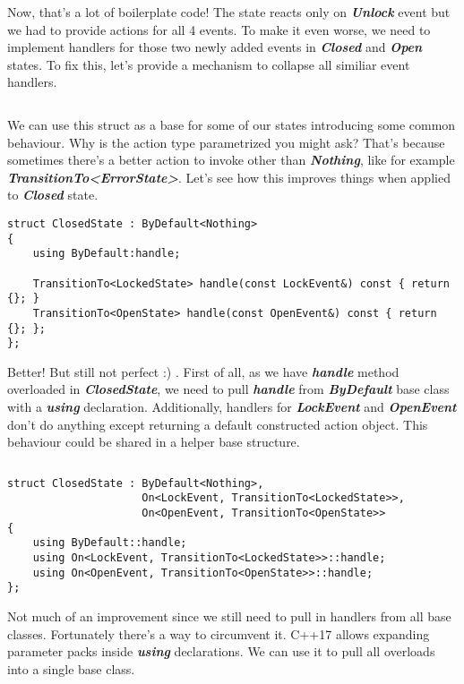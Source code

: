 \documentclass{article}[8pt]
\newcommand{\code}[1]{\textbf{\textit{#1}}}
\newcommand{\closed}{\code{Closed}}
\newcommand{\open}{\code{Open}}
\newcommand{\unlock}{\code{Unlock}}
\begin{document}
Now, that's a lot of boilerplate code! The state reacts only on \unlock{} event but we had to provide actions for all 4 events. To make it even worse, we need to implement handlers for those two newly added events in \closed{} and \open{} states. To fix this, let's provide a mechanism to collapse all similiar event handlers.

\bigskip
\inputminted[firstline=3]{c++}{../fsm/actions/ByDefault.h}
\bigskip

We can use this struct as a base for some of our states introducing some common behaviour. Why is the action type parametrized you might ask? That's because sometimes there's a better action to invoke other than \code{Nothing}, like for example
\\\code{TransitionTo<ErrorState>}. Let's see how this improves things when applied to \closed{} state.

\bigskip
\begin{verbatim}
struct ClosedState : ByDefault<Nothing>
{
	using ByDefault:handle;

	TransitionTo<LockedState> handle(const LockEvent&) const { return {}; }
	TransitionTo<OpenState> handle(const OpenEvent&) const { return {}; };
};
\end{verbatim}
\bigskip

Better! But still not perfect :) . First of all, as we have \code{handle} method overloaded in \code{ClosedState}, we need to pull \code{handle} from \code{ByDefault} base class with a \code{using} declaration.
Additionally, handlers for \code{LockEvent} and \code{OpenEvent} don't do anything except returning a default constructed action object. This behaviour could be shared in a helper base structure.

\bigskip
\inputminted[firstline=3]{c++}{../fsm/actions/On.h}
\bigskip
\begin{verbatim}
struct ClosedState : ByDefault<Nothing>,
					 On<LockEvent, TransitionTo<LockedState>>,
					 On<OpenEvent, TransitionTo<OpenState>>
{
	using ByDefault::handle;
	using On<LockEvent, TransitionTo<LockedState>>::handle;
	using On<OpenEvent, TransitionTo<OpenState>>::handle;
};
\end{verbatim}
\bigskip

Not much of an improvement since we still need to pull in handlers from all base classes. Fortunately there's a way to circumvent it. C++17 allows expanding parameter packs inside \code{using} declarations. We can use it to pull all overloads into a single base class.
\end{document}
